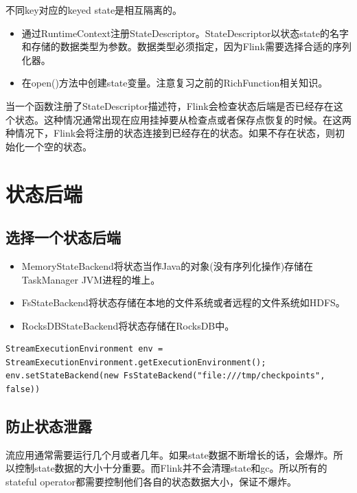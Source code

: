 \documentclass[cn,11pt,chinese]{elegantbook}
\begin{document}
\begin{note}
    不同key对应的keyed state是相互隔离的。
\end{note}

\begin{itemize}
    \item 通过RuntimeContext注册StateDescriptor。StateDescriptor以状态state的名字和存储的数据类型为参数。数据类型必须指定，因为Flink需要选择合适的序列化器。
    \item 在open()方法中创建state变量。注意复习之前的RichFunction相关知识。
\end{itemize}

当一个函数注册了StateDescriptor描述符，Flink会检查状态后端是否已经存在这个状态。这种情况通常出现在应用挂掉要从检查点或者保存点恢复的时候。在这两种情况下，Flink会将注册的状态连接到已经存在的状态。如果不存在状态，则初始化一个空的状态。

\section{状态后端}

\subsection{选择一个状态后端}

\begin{itemize}
    \item MemoryStateBackend将状态当作Java的对象(没有序列化操作)存储在TaskManager JVM进程的堆上。
    \item FsStateBackend将状态存储在本地的文件系统或者远程的文件系统如HDFS。
    \item RocksDBStateBackend将状态存储在RocksDB中。
\end{itemize}

\begin{verbatim}
StreamExecutionEnvironment env = StreamExecutionEnvironment.getExecutionEnvironment();
env.setStateBackend(new FsStateBackend("file:///tmp/checkpoints", false))
\end{verbatim}

\subsection{防止状态泄露}

流应用通常需要运行几个月或者几年。如果state数据不断增长的话，会爆炸。所以控制state数据的大小十分重要。而Flink并不会清理state和gc。所以所有的stateful operator都需要控制他们各自的状态数据大小，保证不爆炸。
\end{document}

